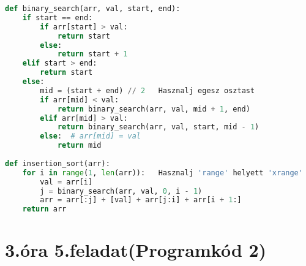 \documentclass[12]{article}
\begin{document}
\begin{lstlisting}[language=Python]
def binary_search(arr, val, start, end):
    if start == end:
        if arr[start] > val:
            return start
        else:
            return start + 1
    elif start > end:
        return start
    else: 
        mid = (start + end) // 2   Hasznalj egesz osztast
        if arr[mid] < val:
            return binary_search(arr, val, mid + 1, end)
        elif arr[mid] > val:
            return binary_search(arr, val, start, mid - 1)
        else:  # arr[mid] = val
            return mid
            
def insertion_sort(arr):
    for i in range(1, len(arr)):   Hasznalj 'range' helyett 'xrange'
        val = arr[i]
        j = binary_search(arr, val, 0, i - 1)
        arr = arr[:j] + [val] + arr[j:i] + arr[i + 1:]
    return arr
\end{lstlisting}
\newpage

\section{3.óra 5.feladat(Programkód 2)}

    
\end{document}

